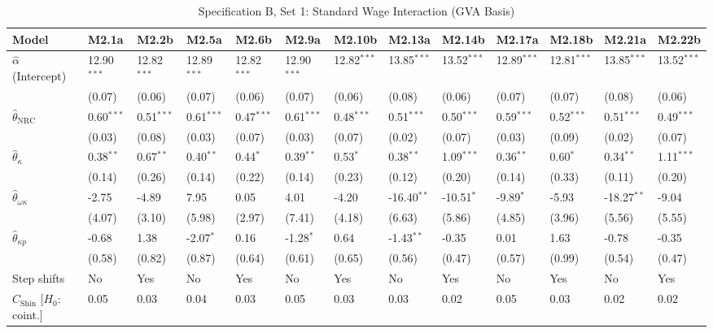 \FloatBarrier
\begin{table}[h!]
\centering
\caption{Specification B, Set 1: Standard Wage Interaction (GVA Basis)}
\label{tab:specB_set1_gva_app}
\tiny
\setlength{\tabcolsep}{1.5pt}
\begin{tabular}{p{3.2cm}p{1.0cm}p{1.0cm}p{1.0cm}p{1.0cm}p{1.0cm}p{1.0cm}p{1.0cm}p{1.0cm}p{1.0cm}p{1.0cm}p{1.0cm}p{1.0cm}}
\toprule
Model & M2.1a & M2.2b & M2.5a & M2.6b & M2.9a & M2.10b & M2.13a & M2.14b & M2.17a & M2.18b & M2.21a & M2.22b \\
\midrule
$\hat{\alpha}$ (Intercept) & 12.90$^{***}$ & 12.82$^{***}$ & 12.89$^{***}$ & 12.82$^{***}$ & 12.90$^{***}$ & 12.82$^{***}$ & 13.85$^{***}$ & 13.52$^{***}$ & 12.89$^{***}$ & 12.81$^{***}$ & 13.85$^{***}$ & 13.52$^{***}$ \\
 & (0.07) & (0.06) & (0.07) & (0.06) & (0.07) & (0.06) & (0.08) & (0.06) & (0.07) & (0.07) & (0.08) & (0.06) \\
$\hat{\theta}_{\text{NRC}}$ & 0.60$^{***}$ & 0.51$^{***}$ & 0.61$^{***}$ & 0.47$^{***}$ & 0.61$^{***}$ & 0.48$^{***}$ & 0.51$^{***}$ & 0.50$^{***}$ & 0.59$^{***}$ & 0.52$^{***}$ & 0.51$^{***}$ & 0.49$^{***}$ \\
 & (0.03) & (0.08) & (0.03) & (0.07) & (0.03) & (0.07) & (0.02) & (0.07) & (0.03) & (0.09) & (0.02) & (0.07) \\
$\hat{\theta}_{\kappa}$ & 0.38$^{**}$ & 0.67$^{**}$ & 0.40$^{**}$ & 0.44$^{*}$ & 0.39$^{**}$ & 0.53$^{*}$ & 0.38$^{**}$ & 1.09$^{***}$ & 0.36$^{**}$ & 0.60$^{*}$ & 0.34$^{**}$ & 1.11$^{***}$ \\
 & (0.14) & (0.26) & (0.14) & (0.22) & (0.14) & (0.23) & (0.12) & (0.20) & (0.14) & (0.33) & (0.11) & (0.20) \\
$\hat{\theta}_{\omega\kappa}$ & -2.75 & -4.89 & 7.95 & 0.05 & 4.01 & -4.20 & -16.40$^{**}$ & -10.51$^{*}$ & -9.89$^{*}$ & -5.93 & -18.27$^{**}$ & -9.04 \\
 & (4.07) & (3.10) & (5.98) & (2.97) & (7.41) & (4.18) & (6.63) & (5.86) & (4.85) & (3.96) & (5.56) & (5.55) \\
$\hat{\theta}_{\kappa p}$ & -0.68 & 1.38 & -2.07$^{*}$ & 0.16 & -1.28$^{*}$ & 0.64 & -1.43$^{**}$ & -0.35 & 0.01 & 1.63 & -0.78 & -0.35 \\
 & (0.58) & (0.82) & (0.87) & (0.64) & (0.61) & (0.65) & (0.56) & (0.47) & (0.57) & (0.99) & (0.54) & (0.47) \\
\midrule
Step shifts & No & Yes & No & Yes & No & Yes & No & Yes & No & Yes & No & Yes \\
$C_{\text{Shin}}$ [$H_0$: coint.] & 0.05 & 0.03 & 0.04 & 0.03 & 0.05 & 0.03 & 0.03 & 0.02 & 0.05 & 0.03 & 0.02 & 0.02 \\

\end{tabular}
\end{table}
